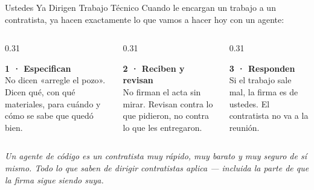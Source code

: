 \documentclass[aspectratio=169, 11pt]{beamer}
\begin{document}
\begin{frame}[shrink=5]{Ustedes Ya Dirigen Trabajo Técnico}
  \vspace{-2pt}
  {\footnotesize\color{textMuted}
  Cuando le encargan un trabajo a un contratista, ya hacen exactamente lo que
  vamos a hacer hoy con un agente:}
  \vspace{7pt}
  \begin{columns}[T]
    \begin{column}{0.31\textwidth}
      \begin{tcolorbox}[colback=arcaGray, colframe=arcaDark, boxrule=0pt,
        leftrule=3pt, arc=3pt, left=6pt, right=6pt, top=5pt, bottom=5pt]
        {\scriptsize\color{arcaDark}\bfseries 1 · Especifican}\\[3pt]
        {\scriptsize\color{textMuted}
         No dicen «arregle el pozo». Dicen qué, con qué materiales, para
         cuándo y cómo se sabe que quedó bien.}
      \end{tcolorbox}
    \end{column}
    \begin{column}{0.31\textwidth}
      \begin{tcolorbox}[colback=arcaGray, colframe=arcaDark, boxrule=0pt,
        leftrule=3pt, arc=3pt, left=6pt, right=6pt, top=5pt, bottom=5pt]
        {\scriptsize\color{arcaDark}\bfseries 2 · Reciben y revisan}\\[3pt]
        {\scriptsize\color{textMuted}
         No firman el acta sin mirar. Revisan contra lo que pidieron, no
         contra lo que les entregaron.}
      \end{tcolorbox}
    \end{column}
    \begin{column}{0.31\textwidth}
      \begin{tcolorbox}[colback=arcaGray, colframe=arcaDark, boxrule=0pt,
        leftrule=3pt, arc=3pt, left=6pt, right=6pt, top=5pt, bottom=5pt]
        {\scriptsize\color{arcaDark}\bfseries 3 · Responden}\\[3pt]
        {\scriptsize\color{textMuted}
         Si el trabajo sale mal, la firma es de ustedes. El contratista no
         va a la reunión.}
      \end{tcolorbox}
    \end{column}
  \end{columns}
  \vspace{8pt}
  {\footnotesize\color{arcaDark}\itshape
   Un agente de código es un contratista muy rápido, muy barato y muy seguro
   de sí mismo. Todo lo que saben de dirigir contratistas aplica ---
   incluida la parte de que la firma sigue siendo suya.}
\end{frame}
\end{document}
